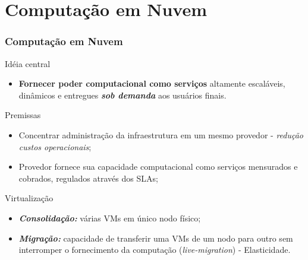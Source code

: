 
\section[Computação em Nuvem]{Computação em Nuvem}

\frame
{
\frametitle{Computação em Nuvem}
	\begin{block}{Idéia central}\small
		 \begin{itemize}
		 	\item \textbf{Fornecer poder computacional como serviços} altamente escaláveis, dinâmicos e entregues \textbf{ \emph{sob demanda}} aos usuários finais.	
		 \end{itemize}
	\end{block}
	\vspace{-3mm}
	\begin{block}{Premissas}\small
		\begin{itemize}
			\vspace{-2mm}
			\item Concentrar administração da infraestrutura em um mesmo provedor - \textit{redução custos operacionais};
			\item Provedor fornece sua capacidade computacional como serviços mensurados e cobrados, regulados através dos SLAs;
		\end{itemize}
	\end{block}
	\vspace{-3mm}
	\begin{block}{Virtualização}\small
		\begin{itemize}
			\item \emph{\textbf{Consolidação:}} várias VMs em único nodo físico;
			\item \emph{\textbf{Migração:}} capacidade de transferir uma VMs de um nodo para outro sem interromper o fornecimento da computação (\textit{live-migration}) - Elasticidade.
		\end{itemize}
	\end{block}
	


}

